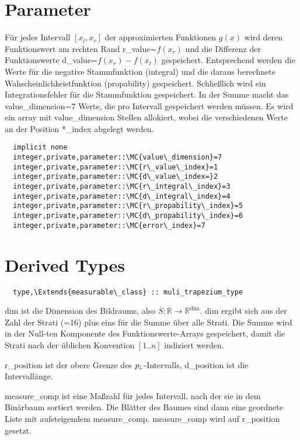 \section{Parameter}
Für jedes Intervall $[x_l,x_r]$ der approximierten Funktionen $g(x)$ wird deren Funktionswert am rechten Rand r\_value=$f(x_r)$ und die Differenz der Funktionswerte d\_value=$f(x_r)-f(x_l)$ gespeichert. Entsprechend werden die Werte für die negative Stammfunktion (integral) und die daraus berechnete Wahscheinlichkeistfunktion (propability) gespeichert. Schließlich wird ein Integrationsfehler für die Stammfunktion gespeichert. In der Summe macht das value\_dimension=7 Werte, die pro Intervall gespeichert werden müssen. Es wird ein array mit value\_dimension Stellen allokiert, wobei die verschiedenen Werte an der Position *\_index abgelegt werden.
\begin{Verbatim}
  implicit none
  integer,private,parameter::\MC{value\_dimension}=7
  integer,private,parameter::\MC{r\_value\_index}=1
  integer,private,parameter::\MC{d\_value\_index=}2
  integer,private,parameter::\MC{r\_integral\_index}=3
  integer,private,parameter::\MC{d\_integral\_index}=4
  integer,private,parameter::\MC{r\_propability\_index}=5
  integer,private,parameter::\MC{d\_propability\_index}=6
  integer,private,parameter::\MC{error\_index}=7
\end{Verbatim}
\section{Derived Types}
\begin{Verbatim}
  type,\Extends{measurable\_class} :: muli_trapezium_type
\end{Verbatim}

dim ist die Dimension des Bildraums, also
$\overline{S}:\mathbb{R}\to\mathbb{R}^{\dim}$. dim ergibt sich aus der Zahl der Strati (=16) plus eins für die Summe über alle Strati. Die Summe wird in der Null-ten Komponente des Funktionswerte-Arrays gespeichert, damit die Strati nach der üblichen Konvention $[1..n]$ indiziert werden.

r\_position ist der obere Grenze des $p_{\!\perp}$-Intervalls, d\_position ist die Intervallänge.

measure\_comp ist eine Maßzahl für jedes Intervall, nach der sie in dem Binärbaum sortiert werden. Die Blätter des Baumes sind dann eine geordnete Liste mit aufsteigendem measure\_comp. measure\_comp wird auf r\_position gesetzt.

